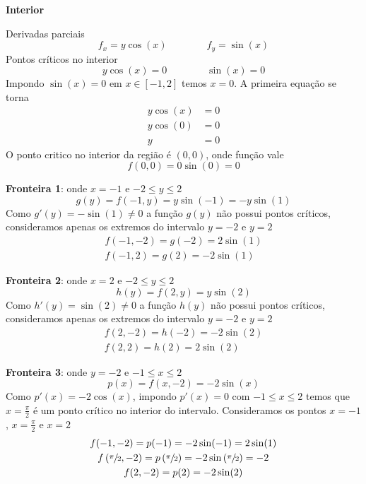 \documentclass[a4paper,12pt,fleqn]{article}
\begin{document}
\begin{answer}
  \textbf{Interior}

  Derivadas parciais
  \[
    f_x = y\cos(x) \qquad\qquad
    f_y =  \sin(x)
  \]
  Pontos críticos no interior
  \[
    y\cos(x) = 0 \qquad\qquad
     \sin(x) = 0
  \]
  Impondo \(\sin(x)=0\) em \(x\in[-1, 2]\) temos $x=0$.
  A primeira equação se torna
  \begin{align*}
    y\cos(x) & = 0 \\
    y\cos(0) & = 0 \\
    y        & = 0
  \end{align*}
  O ponto critico no interior da região é \((0, 0)\), onde função vale
  \[
    f(0, 0)
    = 0\sin(0)
    = 0
  \]

  \textbf{Fronteira 1}: onde \(x=-1\) e \(-2\le y \le 2\)
  \[
    g(y)
    = f(-1, y)
    = y \sin(-1)
    = -y \sin(1)
  \]
  Como \(g'(y) = -\sin(1) \neq 0\)
  a função $g(y)$ não possui pontos críticos,
  consideramos apenas
  os extremos do intervalo $y=-2$ e $y=2$
  \begin{gather*}
    f(-1, -2)
    = g(-2)
    = 2\sin(1)
    \\
    f(-1, 2)
    = g(2)
    = -2\sin(1)
  \end{gather*}

  \textbf{Fronteira 2}: onde \(x=2\) e \(-2\le y \le 2\)
  \[
    h(y)
    = f(2, y)
    = y\sin(2)
  \]
  Como \(h'(y) = \sin(2) \neq 0\)
  a função $h(y)$ não possui pontos críticos,
  consideramos apenas
  os extremos do intervalo $y=-2$ e $y=2$
  \begin{gather*}
    f(2, -2)
    = h(-2)
    = -2\sin(2)
    \\
    f(2, 2)
    = h(2)
    = 2\sin(2)
  \end{gather*}

  \textbf{Fronteira 3}: onde \(y=-2\) e  \(-1 \le x \le 2\)
  \[
    p(x)
    = f(x, -2)
    = -2\sin(x)
  \]
  Como \(p'(x) = -2\cos(x)\), impondo \(p'(x)=0\) com \(-1 \le x \le 2\)
  temos que \(x=\frac{\pi}{2}\) é um ponto crítico no interior do intervalo.
  Consideramos os pontos \(x=-1\), \(x=\frac{\pi}{2}\) e \(x=2\)
  \begin{gather*}
    f(-1, -2)
    = p(-1)
    = -2\sin(-1)
    = 2\sin(1)
    \\
    f\left(\sfrac{\pi}{2}, -2\right)
    = p\left(\sfrac{\pi}{2}\right)
    = -2 \sin\left(\sfrac{\pi}{2}\right)
    = -2
    \\
    f(2, -2)
    = p(2)
    = -2\sin(2)
  \end{gather*}


\end{answer}
\end{document}
